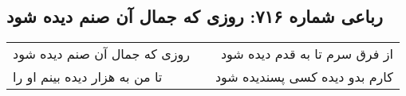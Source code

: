 \begin{center}
\section*{رباعی شماره ۷۱۶: روزی که جمال آن صنم دیده شود}
\label{sec:0716}
\begin{longtable}{l p{0.5cm} r}
روزی که جمال آن صنم دیده شود
&&
از فرق سرم تا به قدم دیده شود
\\
تا من به هزار دیده بینم او را
&&
کارم بدو دیده کسی پسندیده شود
\\
\end{longtable}
\end{center}
